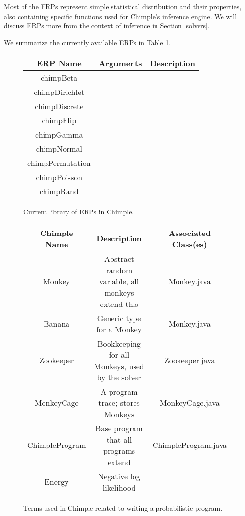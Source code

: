 Most of the ERPs represent simple statistical distribution and their properties,
     also containing specific functions used for Chimple's inference engine.
     We will discuss ERPs more from the context of inference in Section \ref{solvers}.

We summarize the currently available ERPs in Table \ref{monkeys}.

\begin{figure}
   \centering
   \begin{tabular}{ccc}
    \toprule
       ERP Name & Arguments & Description \\
    \midrule
        chimpBeta & \\
        chimpDirichlet & \\
        chimpDiscrete & \\
        chimpFlip & \\
        chimpGamma & \\
        chimpNormal & \\
        chimpPermutation & \\
        chimpPoisson & \\
        chimpRand & \\
    \bottomrule
   \end{tabular}
   \caption{Current library of ERPs in Chimple.}
   \label{monkeys}
\end{figure}

\begin{figure}
\centering
\small
\begin{tabular}{ccc}
\toprule
   Chimple Name & Description & Associated Class(es) \\
\midrule
    Monkey & Abstract random variable, all monkeys extend this & Monkey.java \\
    Banana & Generic type for a Monkey  & Monkey.java \\
    Zookeeper & Bookkeeping for all Monkeys, used by the solver  & Zookeeper.java \\
    MonkeyCage & A program trace; stores Monkeys & MonkeyCage.java \\
    ChimpleProgram & Base program that all programs extend & ChimpleProgram.java \\
    Energy & Negative log likelihood & - \\
\bottomrule
\end{tabular}
\caption{Terms used in Chimple related to writing a probabilistic program.}
\label{terms}
\normalsize
\end{figure}

